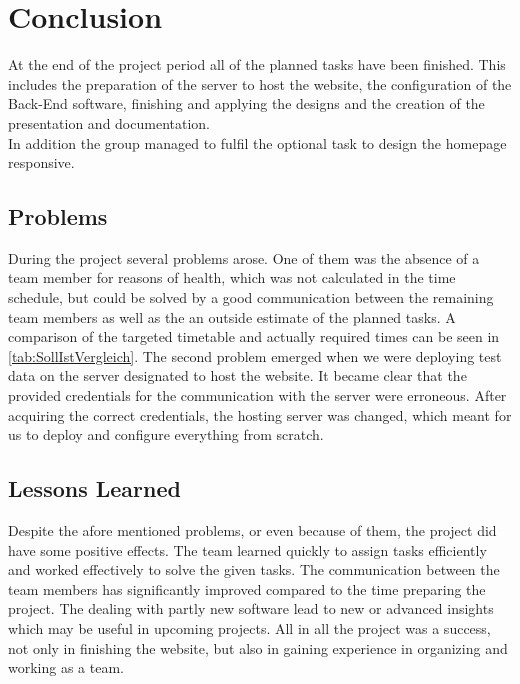 \section{Conclusion} 
\label{sec:Conclusion}
At the end of the project period all of the planned tasks have been finished. 
This includes the preparation of the server to host the website, the configuration 
of the \acs{Back-End} software, finishing and applying the designs and the creation 
of the presentation and documentation.\\
\vspace{10ex}
In addition the group managed to fulfil the optional task to design the homepage \acs{responsive}.

\subsection{Problems}
During the project several problems arose. One of them was the absence of a team member for 
reasons of health, which was not calculated in the time schedule, but could be 
solved by a good communication between the remaining team members as well as the an 
outside estimate of the planned tasks. A comparison of the targeted timetable
and actually required times can be seen in \ref{tab:SollIstVergleich}. The second 
problem emerged when we were deploying test data on the server designated to host 
the website. It became clear that the provided credentials for the communication 
with the server were erroneous. After acquiring the correct credentials, the hosting 
server was changed, which meant for us to deploy and configure everything from scratch.


\subsection{Lessons Learned}
Despite the afore mentioned problems, or even because of them, the project did have 
some positive effects. The team learned quickly to assign tasks efficiently and worked 
effectively to solve the given tasks. The communication between the team members has 
significantly improved compared to the time preparing the project. The dealing with 
partly new software lead to new or advanced insights which may be useful in upcoming 
projects. All in all the project was a success, not only in finishing the website, 
but also in gaining experience in organizing and working as a team.


